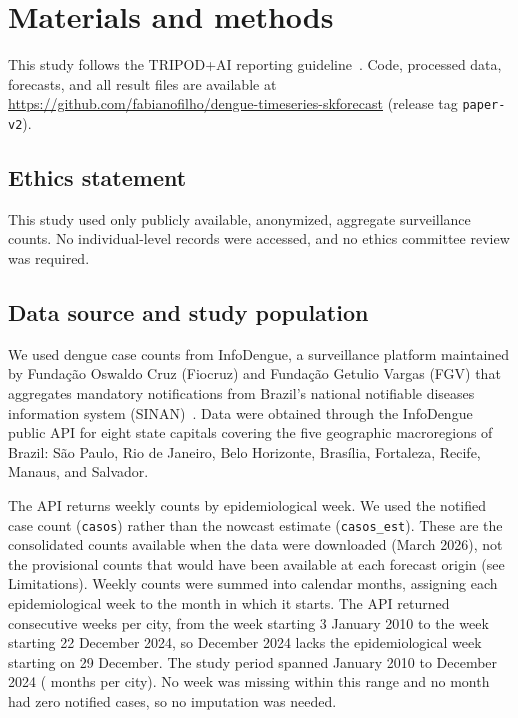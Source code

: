 \documentclass[10pt,letterpaper]{article}
\begin{document}
\section*{Materials and methods}
This study follows the TRIPOD+AI reporting guideline~\cite{Collins2024tripod}. Code, processed data, forecasts, and all result files are available at \url{https://github.com/fabianofilho/dengue-timeseries-skforecast} (release tag \texttt{paper-v2}).

\subsection*{Ethics statement}
This study used only publicly available, anonymized, aggregate surveillance counts. No individual-level records were accessed, and no ethics committee review was required.

\subsection*{Data source and study population}
We used dengue case counts from InfoDengue, a surveillance platform maintained by Funda\c{c}\~ao Oswaldo Cruz (Fiocruz) and Funda\c{c}\~ao Getulio Vargas (FGV) that aggregates mandatory notifications from Brazil's national notifiable diseases information system (SINAN)~\cite{Codeco2018infodengue}. Data were obtained through the InfoDengue public API for eight state capitals covering the five geographic macroregions of Brazil: S\~ao Paulo, Rio de Janeiro, Belo Horizonte, Bras\'ilia, Fortaleza, Recife, Manaus, and Salvador.

The API returns weekly counts by epidemiological week. We used the notified case count (\texttt{casos}) rather than the nowcast estimate (\texttt{casos\_est}). These are the consolidated counts available when the data were downloaded (March 2026), not the provisional counts that would have been available at each forecast origin (see Limitations). Weekly counts were summed into calendar months, assigning each epidemiological week to the month in which it starts. The API returned  consecutive weeks per city, from the week starting 3 January 2010 to the week starting 22 December 2024, so December 2024 lacks the epidemiological week starting on 29 December. The study period spanned January 2010 to December 2024 ( months per city). No week was missing within this range and no month had zero notified cases, so no imputation was needed.
\end{document}

